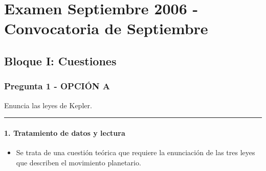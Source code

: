 \chapter{Examen Septiembre 2006 - Convocatoria de Septiembre}
\label{chap:2006_sep}

\section{Bloque I: Cuestiones}
\label{sec:grav_2006_sep}

\subsection{Pregunta 1 - OPCIÓN A}
\label{subsec:1A_2006_sep}

\begin{cajaenunciado}
Enuncia las leyes de Kepler. 
\end{cajaenunciado}
\hrule

\subsubsection*{1. Tratamiento de datos y lectura}
\begin{itemize}
    \item Se trata de una cuestión teórica que requiere la enunciación de las tres leyes que describen el movimiento planetario.
\end{itemize}

